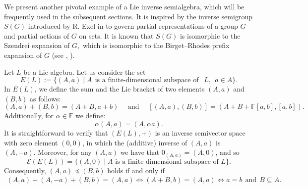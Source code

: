 \documentclass[10pt,a4paper]{amsart}
\theoremstyle{definition}
\theoremstyle{remark}
\numberwithin{equation}{section}
\newtheorem*{Theorem A}{\textbf{Theorem A}}
\newtheorem*{Corollary E}{\textbf{Corollary E}}
\newtheorem*{Corollary F}{\textbf{Corollary F}}
\newtheorem*{Theorem B}{\textbf{Theorem B}}
\newtheorem*{Theorem C}{\textbf{Theorem C}}
\newtheorem*{Theorem D}{\textbf{Theorem B}}
\newtheorem*{p a}{\textbf{Proof of  Theorem A}}
\newtheorem*{p b}{\textbf{Proof of Theorem B}}
\newtheorem*{p c}{\textbf{Proof of  Theorem C}}
\newtheorem*{p d}{\textbf{Proof of  Theorem D}}
\newcommand{\E}{\mathcal{E}}
\newcommand{\F}{\mathbb{F}}
\newcommand{\0}{{\vartheta}}
\begin{document}
We present another pivotal example of a Lie inverse semialgebra, which will be frequently used in the subsequent sections.  It  is inspired by the inverse semigroup $S(G)$  introduced by R. Exel  in  \cite{Exel1998} to govern partial  representations of a group $G$ and partial actions of $G$ on sets.  It is known that $S(G)$ is isomorphic to the Szendrei expansion of $G,$ which is isomorphic to  the Birget–Rhodes prefix expansion of $G$ (see \cite{KL}, \cite{Szendrei}).

Let $L$ be a Lie algebra.  Let us consider the set 
    $$E(L):=\{(A,a) \mid A ~~\text{is a finite-dimensional subspace of }~~L,~~ a\in A\}.$$
In $E(L)$, we define the sum and the Lie bracket of two elements $(A,a)$ and $(B,b)$ as follows: 
$$(A,a)+(B,b)=(A+B,a+b) \quad \mbox{ and } \quad [(A,a), (B,b)]=(A+B+\mathbb{F}[a,b],[a,b]).$$
Additionally, for $\alpha\in \F$ we define:
$$\alpha (A,a)=(A,\alpha a).$$ 
It is straightforward to verify that $(E(L),+)$ is an inverse semivector  space with zero element  $(0,0)$, in which the (additive) inverse of $(A,a)$
is  $(A,-a).$  Moreover, for any $(A,a)$ we have that $0_{(A,a)}=(A,0)$, and so $$\E(E(L))=\{(A,0)\mid A \mbox{ is a finite-dimensional subspace of } L \}.$$ Consequently, $ (A,a)\preceq (B,b)$ holds if and only if 
 \begin{align*}
 (A,a)+ (A,-a)+(B,b)=(A,a)  \Longleftrightarrow (A+ B,b)=(A,a) \Longleftrightarrow a=b ~~\text{and}~~ B\subseteq A.
 \end{align*}
\end{document}
